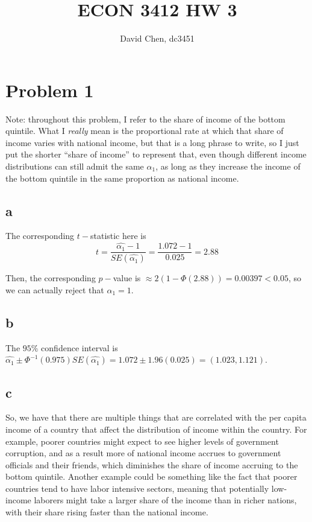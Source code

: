 \documentclass[12pt,letterpaper]{article}
\title{ECON 3412 HW 3}
\author{David Chen, dc3451}
\theoremstyle{definition}
\begin{document}
\maketitle

\section*{Problem 1}

Note: throughout this problem, I refer to the share of income of the bottom quintile. What I \textit{really} mean is the proportional rate at which that share of income varies with national income, but that is a long phrase to write, so I just put the shorter ``share of income'' to represent that, even though different income distributions can still admit the same $\alpha_{1}$, as long as they increase the income of the bottom quintile in the same proportion as national income.

\subsection*{a}

The corresponding $t-$statistic here is
\[
  t = \frac{\hat{\alpha_{1}} - 1}{SE(\hat{\alpha_{1}})} = \frac{1.072 - 1}{0.025} = 2.88
\]

Then, the corresponding $p-$value is $\approx 2(1-\Phi(2.88)) = 0.00397 < 0.05$, so we can actually reject that $\alpha_{1} = 1$.

\subsection*{b}

The $95\%$ confidence interval is $\hat{\alpha_{1}} \pm \Phi^{-1}(0.975)SE(\hat{\alpha_{1}}) = 1.072 \pm 1.96(0.025) = (1.023, 1.121)$.

\subsection*{c}

So, we have that there are multiple things that are correlated with the per capita income of a country that affect the distribution of income within the country. For example, poorer countries might expect to see higher levels of government corruption, and as a result more of national income accrues to government officials and their friends, which diminishes the share of income accruing to the bottom quintile. Another example could be something like the fact that poorer countries tend to have labor intensive sectors, meaning that potentially low-income laborers might take a larger share of the income than in richer nations, with their share rising faster than the national income.
\end{document}
